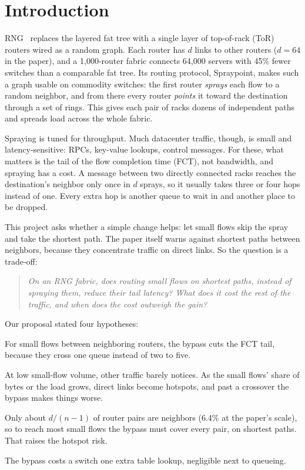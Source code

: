 \section{Introduction}
\label{sec:intro}

RNG~\cite{rng} replaces the layered fat tree with a single layer of top-of-rack (ToR) routers wired as a random graph. Each router has $d$ links to other routers ($d = 64$ in the paper), and a 1{,}000-router fabric connects 64{,}000 servers with 45\% fewer switches than a comparable fat tree. Its routing protocol, Spraypoint, makes such a graph usable on commodity switches: the first router \emph{sprays} each flow to a random neighbor, and from there every router \emph{points} it toward the destination through a set of rings. This gives each pair of racks dozens of independent paths and spreads load across the whole fabric.

Spraying is tuned for throughput. Much datacenter traffic, though, is small and latency-sensitive: RPCs, key-value lookups, control messages. For these, what matters is the tail of the flow completion time (FCT), not bandwidth, and spraying has a cost. A message between two directly connected racks reaches the destination's neighbor only once in $d$ sprays, so it usually takes three or four hops instead of one. Every extra hop is another queue to wait in and another place to be dropped.

This project asks whether a simple change helps: let small flows skip the spray and take the shortest path. The paper itself warns against shortest paths between neighbors, because they concentrate traffic on direct links. So the question is a trade-off:

\begin{quote}
\emph{On an RNG fabric, does routing small flows on shortest paths, instead of spraying them, reduce their tail latency? What does it cost the rest of the traffic, and when does the cost outweigh the gain?}
\end{quote}

Our proposal stated four hypotheses:
\begin{description}[leftmargin=2.5em,style=nextline]
  \item[H1 (latency)] For small flows between neighboring routers, the bypass cuts the FCT tail, because they cross one queue instead of two to five.
  \item[H2 (no free lunch)] At low small-flow volume, other traffic barely notices. As the small flows' share of bytes or the load grows, direct links become hotspots, and past a crossover the bypass makes things worse.
  \item[H3 (reach)] Only about $d/(n-1)$ of router pairs are neighbors (6.4\% at the paper's scale), so to reach most small flows the bypass must cover every pair, on shortest paths. That raises the hotspot risk.
  \item[H4 (overhead)] The bypass costs a switch one extra table lookup, negligible next to queueing.
\end{description}

